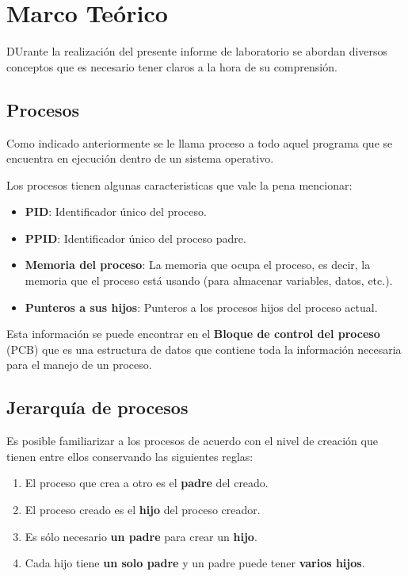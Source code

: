\section{Marco Teórico}
DUrante la realización del presente informe de laboratorio se abordan diversos conceptos que es necesario tener claros a la hora de su comprensión.
\subsection{Procesos}
Como indicado anteriormente se le llama proceso a todo aquel programa que se encuentra en ejecución dentro de un sistema operativo.

Los procesos tienen algunas caracteristicas que vale la pena mencionar:
\begin{itemize}
    \item \textbf{PID}: Identificador único del proceso.
    \item \textbf{PPID}: Identificador único del proceso padre.
    \item \textbf{Memoria del proceso}: La memoria que ocupa el proceso, es decir, la memoria que el proceso está usando (para almacenar variables, datos, etc.).
    \item \textbf{Punteros a sus hijos}: Punteros a los procesos hijos del proceso actual.
\end{itemize}
Esta información se puede encontrar en el \textbf{Bloque de control del proceso} (PCB) que es una estructura de datos que contiene toda la información necesaria para el manejo de un proceso.

\subsection{Jerarquía de procesos}
Es posible familiarizar a los procesos de acuerdo con el nivel de creación que tienen entre ellos conservando las siguientes reglas:

\begin{enumerate}
    \item El proceso que crea a otro es el \textbf{padre} del creado.
    \item El proceso creado es el \textbf{hijo} del proceso creador.
    \item Es sólo necesario \textbf{un padre} para crear un \textbf{hijo}.
    \item Cada hijo tiene \textbf{un solo padre} y un padre puede tener \textbf{varios hijos}.
\end{enumerate}

